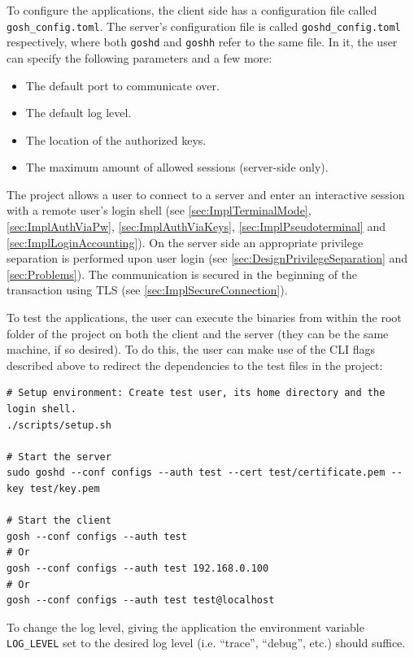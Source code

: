 \documentclass[10pt,a4paper,titlepage,twoside,english,final]{zhawreprt}
\begin{document}
To configure the applications, the client side has a configuration file called \texttt{gosh\_config.toml}.
The server's configuration file is called \texttt{goshd\_config.toml} respectively, where both \texttt{goshd} and \texttt{goshh} refer to the same file.
In it, the user can specify the following parameters and a few more:
\begin{itemize}
\item The default port to communicate over.
\item The default log level.
\item The location of the authorized keys.
\item The maximum amount of allowed sessions (server-side only).
\end{itemize}

The project allows a user to connect to a server and enter an interactive session with a remote user's \gls{login} \gls{shell} (see \ref{sec:ImplTerminalMode}, \ref{sec:ImplAuthViaPw}, \ref{sec:ImplAuthViaKeys}, \ref{sec:ImplPseudoterminal} and \ref{sec:ImplLoginAccounting}).
On the server side an appropriate privilege separation is performed upon user \gls{login} (see \ref{sec:DesignPrivilegeSeparation} and \ref{sec:Problems}).
The communication is secured in the beginning of the transaction using \gls{TLS} (see \ref{sec:ImplSecureConnection}).

To test the applications, the user can execute the binaries from within the root folder of the project on both the client and the server (they can be the same machine, if so desired).
To do this, the user can make use of the \gls{CLI} flags described above to redirect the dependencies to the test files in the project:
\setlistingBash
\begin{lstlisting}[caption={Running the applications for test purposes},label=lst:RunProject,deletekeywords={test}]
# Setup environment: Create test user, its home directory and the login shell.
./scripts/setup.sh

# Start the server
sudo goshd --conf configs --auth test --cert test/certificate.pem --key test/key.pem

# Start the client
gosh --conf configs --auth test
# Or
gosh --conf configs --auth test 192.168.0.100
# Or
gosh --conf configs --auth test test@localhost
\end{lstlisting}

To change the log level, giving the application the environment variable \texttt{LOG\_LEVEL} set to the desired log level (i.e. ``trace'', ``debug'', etc.) should suffice.
\end{document}
